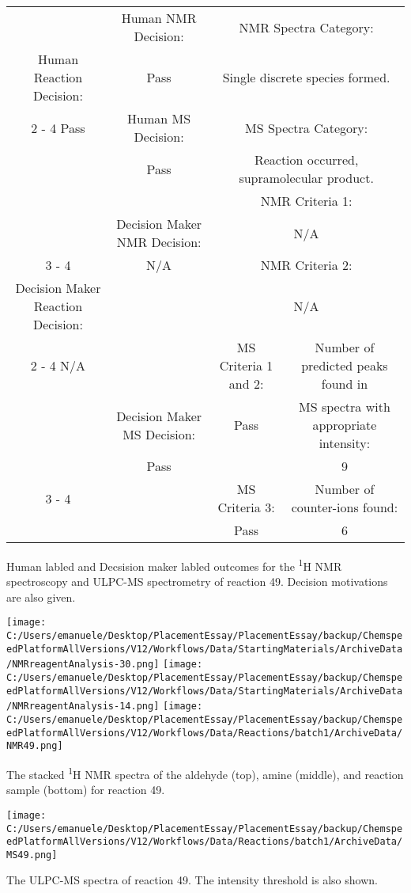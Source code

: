 \documentclass{article}%
\begin{document}
\begin{Decision Table}[H]%
\begin{tabular}{|c|c|c|c|}%
\hline%
&Human NMR Decision:&\multicolumn{2}{|c|}{NMR Spectra Category:}\\%
Human Reaction Decision:&Pass&\multicolumn{2}{|c|}{Single discrete species formed.}\\%
\cline{2%
-%
4}%
Pass&Human MS Decision:&\multicolumn{2}{|c|}{MS Spectra Category:}\\%
&Pass&\multicolumn{2}{|c|}{Reaction occurred, supramolecular product.}\\%
\hline%
&&\multicolumn{2}{|c|}{NMR Criteria 1:}\\%
&Decision Maker NMR Decision:&\multicolumn{2}{|c|}{N/A}\\%
\cline{3%
-%
4}%
&N/A&\multicolumn{2}{|c|}{NMR Criteria 2:}\\%
Decision Maker Reaction Decision:&&\multicolumn{2}{|c|}{N/A}\\%
\cline{2%
-%
4}%
N/A&&MS Criteria 1 and 2:&Number of predicted peaks found in\\%
&Decision Maker MS Decision:&Pass&MS spectra with appropriate intensity:\\%
&Pass&&9\\%
\cline{3%
-%
4}%
&&MS Criteria 3:&Number of counter{-}ions found:\\%
&&Pass&6\\%
\hline%
\end{tabular}%
\caption{Human labled and Decsision maker labled outcomes for the \textsuperscript{1}H NMR spectroscopy and ULPC-MS spectrometry of reaction 49. Decision motivations are also given.}%
\end{Decision Table}%
\begin{NMR Spectra}[H]%
\begin{center}%
\texttt{[image: C:/Users/emanuele/Desktop/PlacementEssay/PlacementEssay/backup/ChemspeedPlatformAllVersions/V12/Workflows/Data/StartingMaterials/ArchiveData/NMRreagentAnalysis-30.png]}\hfill%
\texttt{[image: C:/Users/emanuele/Desktop/PlacementEssay/PlacementEssay/backup/ChemspeedPlatformAllVersions/V12/Workflows/Data/StartingMaterials/ArchiveData/NMRreagentAnalysis-14.png]}\hfill%
\texttt{[image: C:/Users/emanuele/Desktop/PlacementEssay/PlacementEssay/backup/ChemspeedPlatformAllVersions/V12/Workflows/Data/Reactions/batch1/ArchiveData/NMR49.png]}\hfill%
\end{center}%
\caption{The stacked \textsuperscript{1}H NMR spectra of the aldehyde (top), amine (middle), and reaction sample (bottom) for reaction 49.}%
\end{NMR Spectra}%
\begin{MS Spectra}[H]%
\begin{center}%
\texttt{[image: C:/Users/emanuele/Desktop/PlacementEssay/PlacementEssay/backup/ChemspeedPlatformAllVersions/V12/Workflows/Data/Reactions/batch1/ArchiveData/MS49.png]}\hfill%
\end{center}%
\caption{The ULPC-MS spectra of reaction 49. The intensity threshold is also shown.}%
\end{MS Spectra}%
\end{document}
